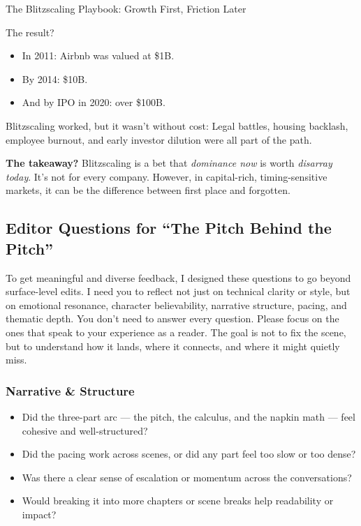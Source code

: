\begin{HistoricalSidebar}{The Blitzscaling Playbook: Growth First, Friction Later}
  \medskip
  
  The result?

  \medskip
  
  \begin{itemize}
    \item In 2011: Airbnb was valued at \$1B.
    \item By 2014: \$10B.
    \item And by IPO in 2020: over \$100B.
  \end{itemize}
  
  \medskip
  
  Blitzscaling worked, but it wasn't without cost:  
  Legal battles, housing backlash, employee burnout, and early investor dilution were all part of the path.
  
  \medskip
  
  \textbf{The takeaway?}  
  Blitzscaling is a bet that \textit{dominance now} is worth \textit{disarray today}.  
  It’s not for every company. However, in capital-rich, timing-sensitive markets, it can be the difference between first place 
  and forgotten.
  
\end{HistoricalSidebar}


\subsection*{Editor Questions for ``The Pitch Behind the Pitch''}

To get meaningful and diverse feedback, I designed these questions to go beyond surface-level edits.
I need you to reflect not just on technical clarity or style, but on emotional resonance, character
believability, narrative structure, pacing, and thematic depth. You don’t need to answer every question.
Please focus on the ones that speak to your experience as a reader. The goal is not to fix the scene,
but to understand how it lands, where it connects, and where it might quietly miss.

\subsubsection{Narrative \& Structure}

\begin{itemize}
\item Did the three-part arc — the pitch, the calculus, and the napkin math — feel cohesive and well-structured?
\item Did the pacing work across scenes, or did any part feel too slow or too dense?
\item Was there a clear sense of escalation or momentum across the conversations?
\item Would breaking it into more chapters or scene breaks help readability or impact?
\end{itemize}

